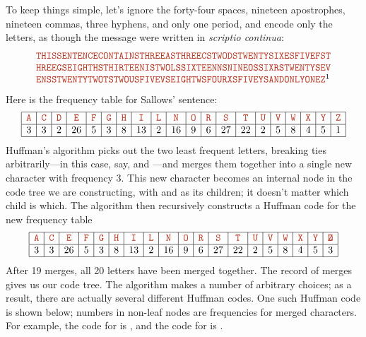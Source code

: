To keep things simple, let’s ignore the forty-four spaces, nineteen apostrophes, nineteen commas, three hyphens, and only one period, and encode only the letters, as though the message were written in \textit{scriptio continua}:
\[
\begin{array}{l}
\mbox{\Str{THISSENTENCECONTAINSTHREEASTHREECSTWODSTWENTYSIXESFIVEFST}}\\
\mbox{\Str{HREEGSEIGHTHSTHIRTEENISTWOLSSIXTEENNSNINEOSSIXRSTWENTYSEV}}\\
\mbox{\Str{ENSSTWENTYTWOTSTWOUSFIVEVSEIGHTWSFOURXSFIVEYSANDONLYONEZ}\footnotemark}
\end{array}
\]
Here is the frequency table for Sallows’ sentence:
{\setlength{\arraycolsep}{3pt}\small
\[
\begin{array}{|c|c|c|c|c|c|c|c|c|c|c|c|c|c|c|c|c|c|c|c|}
\hline
\mbox{\Str{A}} & \mbox{\Str{C}} & \mbox{\Str{D}} & \mbox{\Str{E}} & \mbox{\Str{F}} & \mbox{\Str{G}} & \mbox{\Str{H}} & \mbox{\Str{I}} & \mbox{\Str{L}} & \mbox{\Str{N}} & \mbox{\Str{O}} & \mbox{\Str{R}} & \mbox{\Str{S}} & \mbox{\Str{T}} & \mbox{\Str{U}} & \mbox{\Str{V}} & \mbox{\Str{W}} & \mbox{\Str{X}} & \mbox{\Str{Y}} & \mbox{\Str{Z}}\\
\hline
3 & 3 & 2 & 26 & 5 & 3 & 8 & 13 & 2 & 16 & 9 & 6 & 27 & 22 & 2 & 5 & 8 & 4 & 5 & 1\\
\hline
\end{array}
\]
}
Huffman’s algorithm picks out the two least frequent letters, breaking ties arbitrarily---in this case, say,  and ---and merges them together into a single new character  with frequency $3$.
This new character becomes an internal node in the code tree we are constructing, with  and  as its children; it doesn’t matter which child is which.
The algorithm then recursively constructs a Huffman code for the new frequency table
{\setlength{\arraycolsep}{3pt}\small
\[
\begin{array}{|c|c|c|c|c|c|c|c|c|c|c|c|c|c|c|c|c|c|c|}
\hline
\mbox{\Str{A}} & \mbox{\Str{C}} & \mbox{\Str{E}} & \mbox{\Str{F}} & \mbox{\Str{G}} & \mbox{\Str{H}} & \mbox{\Str{I}} & \mbox{\Str{L}} & \mbox{\Str{N}} & \mbox{\Str{O}} & \mbox{\Str{R}} & \mbox{\Str{S}} & \mbox{\Str{T}} & \mbox{\Str{U}} & \mbox{\Str{V}} & \mbox{\Str{W}} & \mbox{\Str{X}} & \mbox{\Str{Y}} & \mbox{\Str{\rlap{D}Z}}\\
\hline
3 & 3 & 26 & 5 & 3 & 8 & 13 & 2 & 16 & 9 & 6 & 27 & 22 & 2 & 5 & 8 & 4 & 5 & 3\\
\hline
\end{array}
\]
}
After 19 merges, all 20 letters have been merged together.
The record of merges gives us our code tree.
The algorithm makes a number of arbitrary choices; as a result, there are actually several different Huffman codes.
One such Huffman code is shown below; numbers in non-leaf nodes are frequencies for merged characters.
For example, the code for  is \mbox{\color{JEblue}}, and the code for  is \mbox{\color{JEblue}}.

